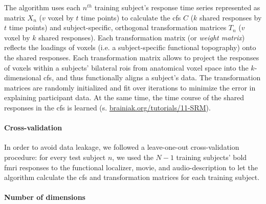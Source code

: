 
The algorithm uses each $n^{th}$ training subject's response time series
represented as matrix $X_{n}$ ({$v$} voxel by $t$ time points) to calculate the
\ac{cfs} $C$ ($k$ shared responses by $t$ time points) and subject-specific,
orthogonal transformation matrices $T_{n}$ ($v$ voxel by $k$ shared responses).
Each transformation matrix (or \textit{weight matrix}) reflects the loadings of
voxels (i.e. a subject-specific functional topography) onto the shared
responses.
Each transformation matrix allows to project the responses of voxels within a
subjects' bilateral \acp{roi} from anatomical voxel space into the
$k$-dimensional \ac{cfs}, and thus functionally aligns a subject's data.
The transformation matrices are randomly initialized and fit over iterations to
minimize the error in explaining participant data.
%
At the same time, the time course of the shared responses in the \ac{cfs} is
learned (s.
\href{https://brainiak.org/tutorials/11-SRM/}{\url{brainiak.org/tutorials/11-SRM}}).



\paragraph{Cross-validation}

%
In order to avoid data leakage, we followed a leave-one-out cross-validation
procedure:
%
for every test subject $n$, we used the $N-1$ training subjects' \ac{bold}
\ac{fmri} responses to the functional localizer, movie, and audio-description to
let the algorithm calculate the \ac{cfs} and transformation matrices for each
training subject.


\paragraph{Number of dimensions}

